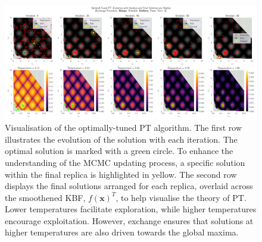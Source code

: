 \documentclass[10pt]{article}
\begin{document}
\begin{figure}[H]
    \centering
    \includegraphics[width=1.1\textwidth]{../figures/Permanent Images/PT_Optimal_Tuning.png}
    \captionsetup{justification=centering}
    \caption{Visualisation of the optimally-tuned PT algorithm. The first row illustrates the evolution of the solution with each iteration. The optimal solution is marked with a green circle. To enhance the understanding of the MCMC updating process, a specific solution within the final replica is highlighted in yellow. The second row displays the final solutions arranged for each replica, overlaid across the smoothened KBF, $f(\mathbf{x})^T$, to help visualise the theory of PT. Lower temperatures facilitate exploration, while higher temperatures encourage exploitation. However, exchange ensures that solutions at higher temperatures are also driven towards the global maxima.}
    \label{fig:PToptimal_evo}
\end{figure}
\end{document}
